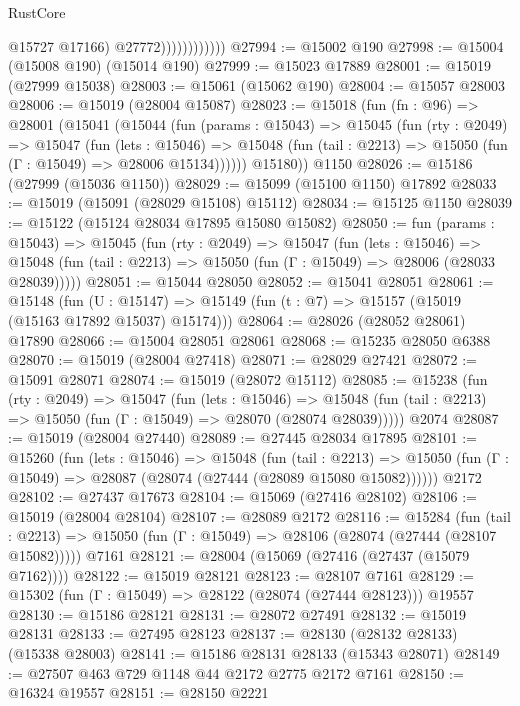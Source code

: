 \begin{lexlean}{RustCore}
\begin{coremodule}
                              @15727
                              @17166)
                            @27772))))))))))))
@27994 := @15002 @190
@27998 := @15004 (@15008 @190) (@15014 @190)
@27999 := @15023 @17889
@28001 := @15019 (@27999 @15038)
@28003 := @15061 (@15062 @190)
@28004 := @15057 @28003
@28006 := @15019 (@28004 @15087)
@28023 := @15018
    (fun (fn : @96) =>
    @28001
      (@15041
        (@15044
          (fun (params : @15043) =>
          @15045
            (fun (rty : @2049) =>
            @15047
              (fun (lets : @15046) =>
              @15048 (fun (tail : @2213) => @15050 (fun (Γ : @15049) => @28006 @15134))))))
        @15180))
    @1150
@28026 := @15186 (@27999 (@15036 @1150))
@28029 := @15099 (@15100 @1150) @17892
@28033 := @15019 (@15091 (@28029 @15108) @15112)
@28034 := @15125 @1150
@28039 := @15122 (@15124 @28034 @17895 @15080 @15082)
@28050 := fun (params : @15043) =>
  @15045
    (fun (rty : @2049) =>
    @15047
      (fun (lets : @15046) =>
      @15048 (fun (tail : @2213) => @15050 (fun (Γ : @15049) => @28006 (@28033 @28039)))))
@28051 := @15044 @28050
@28052 := @15041 @28051
@28061 := @15148
    (fun (U : @15147) => @15149 (fun (t : @7) => @15157 (@15019 (@15163 @17892 @15037) @15174)))
@28064 := @28026 (@28052 @28061) @17890
@28066 := @15004 @28051 @28061
@28068 := @15235 @28050 @6388
@28070 := @15019 (@28004 @27418)
@28071 := @28029 @27421
@28072 := @15091 @28071
@28074 := @15019 (@28072 @15112)
@28085 := @15238
    (fun (rty : @2049) =>
    @15047
      (fun (lets : @15046) =>
      @15048 (fun (tail : @2213) => @15050 (fun (Γ : @15049) => @28070 (@28074 @28039)))))
    @2074
@28087 := @15019 (@28004 @27440)
@28089 := @27445 @28034 @17895
@28101 := @15260
    (fun (lets : @15046) =>
    @15048
      (fun (tail : @2213) =>
      @15050 (fun (Γ : @15049) => @28087 (@28074 (@27444 (@28089 @15080 @15082))))))
    @2172
@28102 := @27437 @17673
@28104 := @15069 (@27416 @28102)
@28106 := @15019 (@28004 @28104)
@28107 := @28089 @2172
@28116 := @15284
    (fun (tail : @2213) => @15050 (fun (Γ : @15049) => @28106 (@28074 (@27444 (@28107 @15082)))))
    @7161
@28121 := @28004 (@15069 (@27416 (@27437 (@15079 @7162))))
@28122 := @15019 @28121
@28123 := @28107 @7161
@28129 := @15302 (fun (Γ : @15049) => @28122 (@28074 (@27444 @28123))) @19557
@28130 := @15186 @28121
@28131 := @28072 @27491
@28132 := @15019 @28131
@28133 := @27495 @28123
@28137 := @28130 (@28132 @28133) (@15338 @28003)
@28141 := @15186 @28131 @28133 (@15343 @28071)
@28149 := @27507 @463 @729 @1148 @44 @2172 @2775 @2172 @7161
@28150 := @16324 @19557
@28151 := @28150 @2221

\end{coremodule}
\end{lexlean}
